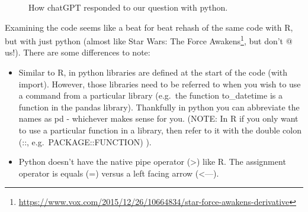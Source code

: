 \documentclass[
  letterpaper,
]{krantz}
\providecommand{\tightlist}{%
  \setlength{\itemsep}{0pt}\setlength{\parskip}{0pt}}\usepackage{longtable,booktabs,array}
\renewcommand{\href}[2]{#2\footnote{\url{#1}}}
\begin{document}
\begin{figure}


\caption{\label{fig-chatgpt-python}How chatGPT responded to our question
with python.}

\end{figure}%

Examining the code seems like a beat for beat rehash of the same code
with R, but with just python (almost like
\href{https://www.vox.com/2015/12/26/10664834/star-force-awakens-derivative}{Star
Wars: The Force Awakens}, but don't @ us!). There are some differences
to note:

\begin{itemize}
\tightlist
\item
  Similar to R, in python libraries are defined at the start of the code
  (with import). However, those libraries need to be referred to when
  you wish to use a command from a particular library (e.g.~the function
  to\_datetime is a function in the pandas library). Thankfully in
  python you can abbreviate the names as pd - whichever makes sense for
  you. (NOTE: In R if you only want to use a particular function in a
  library, then refer to it with the double colon (::,
  e.g.~PACKAGE::FUNCTION) ).
\item
  Python doesn't have the native pipe operator (\textbar\textgreater)
  like R. The assignment operator is equals (=) versus a left facing
  arrow (\textless---).
\end{itemize}
\end{document}
